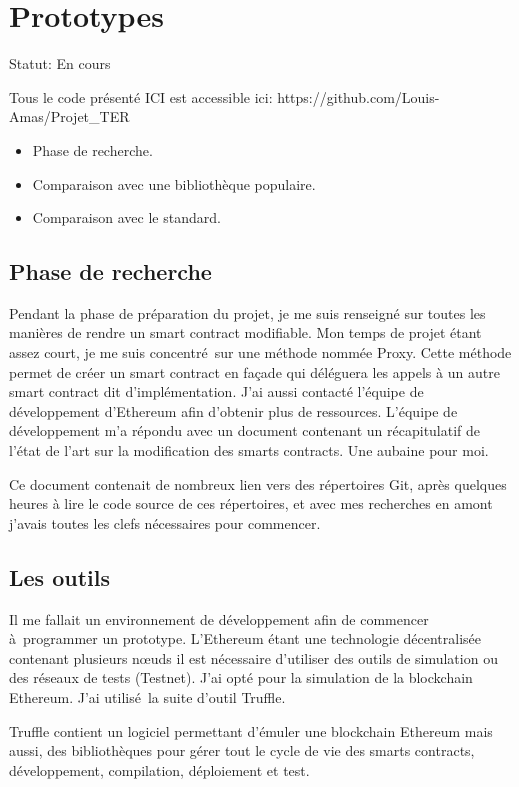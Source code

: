 \section{Prototypes}

Statut: En cours


Tous le code présenté ICI est accessible ici:
https://github.com/Louis-Amas/Projet\_TER

\begin{itemize}
    \item Phase de recherche.
    \item Comparaison avec une bibliothèque populaire.
    \item Comparaison avec le standard.
\end{itemize}

\subsection{Phase de recherche}

Pendant la phase de préparation du projet, je me suis renseigné sur toutes les manières de rendre un smart contract modifiable.
Mon temps de projet étant assez court, je me suis concentré sur une méthode nommée Proxy. Cette méthode permet de créer un
smart contract en façade qui déléguera les appels à un autre smart contract dit d'implémentation. J'ai aussi contacté
l'équipe de développement d'Ethereum afin d'obtenir plus de ressources. L'équipe de développement m'a répondu avec un document
contenant un récapitulatif de l'état de l'art sur la modification des smarts contracts. Une aubaine pour moi.

Ce document contenait de nombreux lien vers des répertoires Git, après quelques heures à lire le code source de ces répertoires,
et avec mes recherches en amont j'avais toutes les clefs nécessaires pour commencer. 

\subsection{Les outils}

Il me fallait un environnement de développement afin de commencer à programmer un prototype. L'Ethereum étant une technologie
décentralisée contenant plusieurs nœuds il est nécessaire d'utiliser des outils de simulation ou des réseaux de tests (Testnet).
J'ai opté pour la simulation de la blockchain Ethereum. J'ai utilisé la suite d'outil Truffle.

Truffle contient un logiciel permettant d'émuler une blockchain Ethereum mais aussi, des bibliothèques pour gérer tout le cycle 
de vie des smarts contracts, développement, compilation, déploiement et test.

